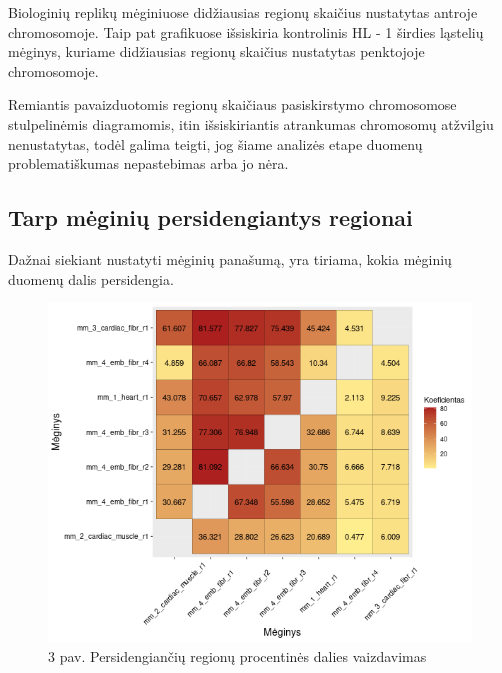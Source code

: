 \documentclass[12pt]{article}
\begin{document}
Biologinių replikų mėginiuose didžiausias regionų skaičius
nustatytas antroje chromosomoje. Taip pat grafikuose išsiskiria
kontrolinis HL - 1 širdies ląstelių mėginys, kuriame didžiausias
regionų skaičius nustatytas penktojoje chromosomoje.

Remiantis pavaizduotomis regionų skaičiaus pasiskirstymo
chromosomose stulpelinėmis diagramomis, itin išsiskiriantis
atrankumas chromosomų atžvilgiu nenustatytas, todėl galima
teigti, jog šiame analizės etape duomenų problematiškumas
nepastebimas arba jo nėra.

\newpage

\subsection{Tarp mėginių persidengiantys regionai}
Dažnai siekiant nustatyti mėginių panašumą, yra tiriama, kokia
mėginių duomenų dalis persidengia.

\begin{figure}[htb]
    \begin{center}
        \includegraphics[width=0.8\linewidth]{Figures/peak_overlaps_between_samples.png}
        \caption*{3 pav. Persidengiančių regionų procentinės dalies vaizdavimas}
    \end{center}
\end{figure}
\end{document}
